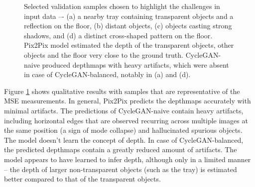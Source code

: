 \begin{figure}[h!]
    \centering
    \caption{Selected validation samples chosen to highlight the challenges in input data –- (a) a nearby tray containing transparent objects and a reflection on the floor, (b) distant objects, (c) objects casting strong shadows, and (d) a distinct cross-shaped pattern on the floor. Pix2Pix model estimated the depth of the transparent objects, other objects and the floor very close to the ground truth. CycleGAN-naive produced depthmaps with heavy artifacts, which were absent in case of CycleGAN-balanced, notably in (a) and (d).}
    \label{fig:cleargrasp_qual}
\end{figure}

Figure \ref{fig:cleargrasp_qual} shows qualitative results with samples that are representative of the MSE measurements. In general, Pix2Pix predicts the depthmaps accurately with minimal artifacts. The predictions of CycleGAN-naive contain heavy artifacts, including horizontal edges that are observed recurring across multiple images at the same position (a sign of mode collapse) and hallucinated spurious objects. The model doesn't learn the concept of depth. In case of CycleGAN-balanced, the predicted depthmaps contain a greatly reduced amount of artifacts. The model appears to have learned to infer depth, although only in a limited manner -- the depth of larger non-transparent objects (such as the tray) is estimated better compared to that of the transparent objects.

